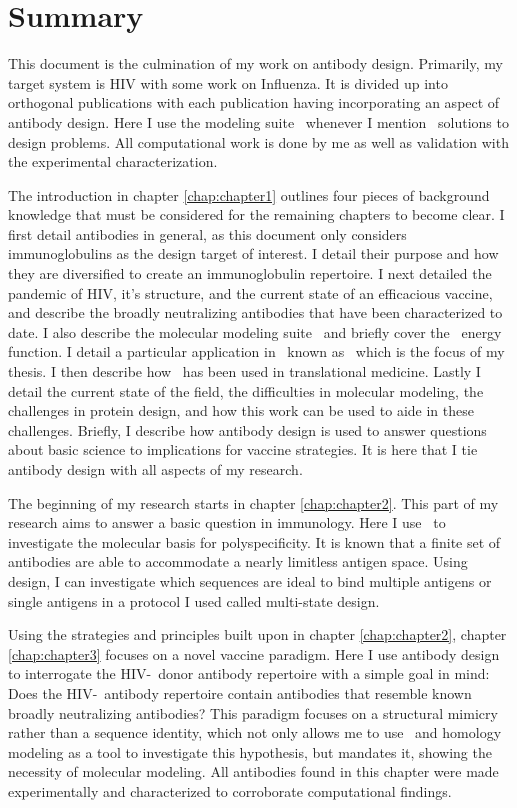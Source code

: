\chapter*{Summary}
\vspace{7mm}
This document is the culmination of my work on antibody design. Primarily, my target system is HIV with some work on Influenza. It is divided up into orthogonal publications with each publication having incorporating an aspect of antibody design. Here I use the modeling suite \rosetta~whenever I mention \silico~solutions to design problems. All computational work is done by me as well as validation with the experimental characterization.

The introduction in chapter \ref{chap:chapter1} outlines four pieces of background knowledge that must be considered for the remaining chapters to become clear. I first detail antibodies in general, as this document only considers immunoglobulins as the design target of interest. I detail their purpose and how they are diversified to create an immunoglobulin repertoire. I next detailed the pandemic of HIV, it's structure, and the current state of an efficacious vaccine, and describe the broadly neutralizing antibodies that have been characterized to date. I also describe the molecular modeling suite \rosetta~and briefly cover the \rosetta~energy function. I detail a particular application in \rosetta~known as \rosettadesign~which is the focus of my thesis. I then describe how \rosettadesign~has been used in translational medicine. Lastly I detail the current state of the field, the difficulties in molecular modeling, the challenges in protein design, and how this work can be used to aide in these challenges. Briefly, I describe how antibody design is used to answer questions about basic science to implications for vaccine strategies. It is here that I tie antibody design with all aspects of my research.

The beginning of my research starts in chapter \ref{chap:chapter2}. This part of my research aims to answer a basic question in immunology. Here I use \rosettadesign~to investigate the molecular basis for polyspecificity. It is known that a finite set of antibodies are able to accommodate a nearly limitless antigen space. Using design, I can investigate which sequences are ideal to bind multiple antigens or single antigens in a protocol I used called multi-state design.

Using the strategies and principles built upon in chapter \ref{chap:chapter2}, chapter \ref{chap:chapter3} focuses on a novel vaccine paradigm. Here I use antibody design to interrogate the HIV-\naive~donor antibody repertoire with a simple goal in mind: Does the HIV-\naive~antibody repertoire contain antibodies that resemble known broadly neutralizing antibodies? This paradigm focuses on a structural mimicry rather than a sequence identity, which not only allows me to use \rosettadesign~and homology modeling as a tool to investigate this hypothesis, but mandates it, showing the necessity of molecular modeling. All antibodies found in this chapter were made experimentally and characterized to corroborate computational findings.

